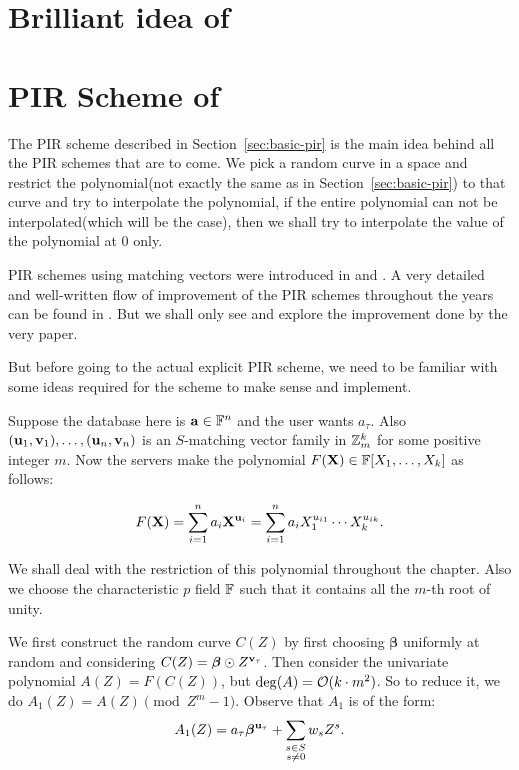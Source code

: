 \section{Brilliant idea of \cite{dvir-gopi}}

\section{PIR Scheme of \cite{improved-pir}}

The PIR scheme described in Section~\ref{sec:basic-pir} is the main idea behind all the PIR schemes that are to come. We pick a random curve in a space and restrict the polynomial(not exactly the same as in Section~\ref{sec:basic-pir}) to that curve and try to interpolate the polynomial, if the entire polynomial can not be interpolated(which will be the case), then we shall try to interpolate the value of the polynomial at $0$ only. 

PIR schemes using matching vectors were introduced in \cite{yek08-3ldc} and \cite{efr09}. A very detailed and well-written flow of improvement of the PIR schemes throughout the years can be found in \cite{improved-pir}. But we shall only see and explore the improvement done by the very paper. 

But before going to the actual explicit PIR scheme, we need to be familiar with some ideas required for the scheme to make sense and implement.

Suppose the database here is $\mathbf{a}\in\mathbb{F}^n$ and the user wants $a_{\tau}$. Also $(\mathbf{u}_1,\mathbf{v}_1),\ldots,(\mathbf{u}_n,\mathbf{v}_n)$ is an $S$-matching vector family in $\mathbb{Z}_m^k$ for some positive integer $m$. Now the servers make the polynomial $F(\mathbf{X})\in\mathbb{F}[X_1,\ldots,X_k]$ as follows:

\[
    F(\mathbf{X}) = \sum_{i = 1}^{n} a_i\mathbf{X}^{\mathbf{u}_i} = \sum_{i = 1}^{n}a_i X_1^{u_{i1}}\cdots X_k^{u_{ik}}.
\]

We shall deal with the restriction of this polynomial throughout the chapter. Also we choose the characteristic $p$ field $\mathbb{F}$ such that it contains all the $m$-th root of unity.

We first construct the random curve $C(Z)$ by first choosing $\bm{\beta}$ uniformly at random and considering $C(Z) = \bm{\beta}\odot Z^{\mathbf{v}_{\tau}}$. Then consider the univariate polynomial $A(Z) = F(C(Z))$, but $\deg(A) = \mathcal{O}(k\cdot m^2)$. So to reduce it, we do $A_1(Z) = A(Z) \pmod{Z^m - 1}$. Observe that $A_1$ is of the form: 
\[
    A_1(Z) = a_{\tau}\bm{\beta}^{\mathbf{u}_{\tau}} + \sum_{\substack{s\in S \\ s \neq 0}} w_s Z^s.
\]

